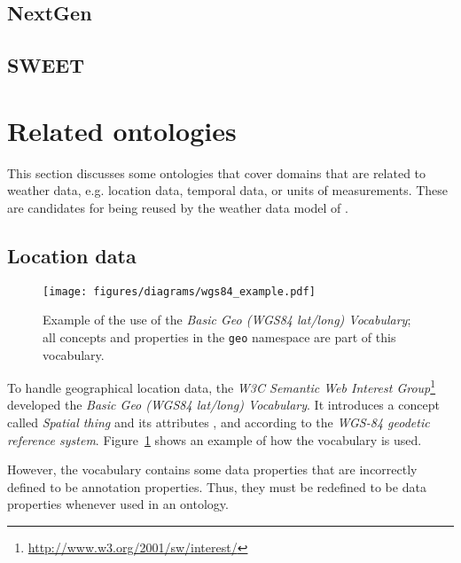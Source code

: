 
\subsection{NextGen}


\subsection{SWEET}


\section{Related ontologies}
\label{sec:related_ontologies}

This section discusses some ontologies that cover domains that are related to weather data, e.g. location data, temporal data, or units of measurements. These are candidates for being reused by the weather data model of \thinkhome.

\subsection{Location data}
\label{subsec:location_ontologies}


\begin{figure}
\centering
\texttt{[image: figures/diagrams/wgs84\_example.pdf]}
\caption{Example of the use of the \emph{Basic Geo (WGS84 lat/long) Vocabulary}; all concepts and properties in the \texttt{geo} namespace are part of this vocabulary.}
\label{fig:wgs84_example}
\end{figure}

To handle geographical location data, the \emph{W3C Semantic Web Interest Group}\footnote{\href{http://www.w3.org/2001/sw/interest/}{http://www.w3.org/2001/sw/interest/}} developed the \emph{Basic Geo (WGS84 lat/long) Vocabulary}\cite{wgs84_vocabulary}. It introduces a concept called \emph{Spatial thing} and its attributes ,  and  according to the \emph{WGS-84 geodetic reference system}\cite{WGS84}. Figure~\ref{fig:wgs84_example} shows an example of how the vocabulary is used.

However, the vocabulary contains some data properties that are incorrectly defined to be annotation properties. Thus, they must be redefined to be data properties whenever used in an  ontology.

